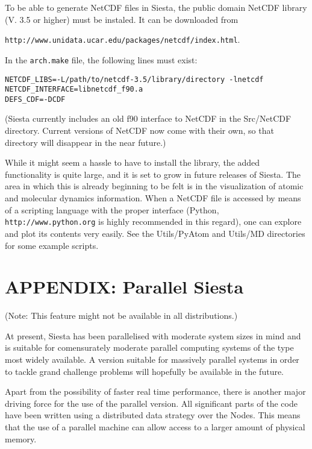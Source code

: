 \documentclass[11pt]{article}
\begin{document}
To be able to generate NetCDF files in {\sc Siesta}, the public domain
NetCDF library (V. 3.5 or higher) must be instaled. It can be
downloaded from 

{\tt http://www.unidata.ucar.edu/packages/netcdf/index.html}. 

In the {\tt arch.make} file, the following lines must exist:
\begin{verbatim}
NETCDF_LIBS=-L/path/to/netcdf-3.5/library/directory -lnetcdf
NETCDF_INTERFACE=libnetcdf_f90.a
DEFS_CDF=-DCDF
\end{verbatim}

({\sc Siesta} currently includes an old f90 interface to NetCDF in the
Src/NetCDF directory. Current versions of NetCDF now come with their
own, so that directory will disappear in the near future.)

While it might seem a hassle to have to install the library, the added
functionality is quite large, and it is set to grow in future releases
of {\sc Siesta}. The area in which this is already beginning to be
felt is in the visualization of atomic and molecular dynamics
information. When a NetCDF file is accessed by means of a scripting
language with the proper interface (Python, {\tt
http://www.python.org} is highly recommended in this regard), one can
explore and plot its contents very easily.  See the Utils/PyAtom and Utils/MD
directories for some example scripts.  


\newpage
\section{APPENDIX: Parallel {\sc Siesta}}

(Note: This feature might not be available in all distributions.)

At present, {\sc Siesta} has been parallelised with moderate system sizes
in mind and is suitable for comensurately moderate parallel computing
systems of the type most widely available. A version suitable for
massively parallel systems in order to tackle grand challenge problems
will hopefully be available in the future.

Apart from the possibility of faster real time performance, there is
another major driving force for the use of the parallel version. All
significant parts of the code have been written using a distributed
data strategy over the Nodes. This means that the use of a parallel
machine can allow access to a larger amount of physical memory.
\end{document}
